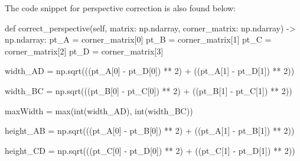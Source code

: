 \documentclass[
]{article}
\newenvironment{Shaded}{\begin{snugshade}}{\end{snugshade}}
\newcommand{\BuiltInTok}[1]{\textcolor[rgb]{0.00,0.23,0.31}{#1}}
\newcommand{\DecValTok}[1]{\textcolor[rgb]{0.68,0.00,0.00}{#1}}
\newcommand{\KeywordTok}[1]{\textcolor[rgb]{0.00,0.23,0.31}{#1}}
\newcommand{\NormalTok}[1]{\textcolor[rgb]{0.00,0.23,0.31}{#1}}
\newcommand{\OperatorTok}[1]{\textcolor[rgb]{0.37,0.37,0.37}{#1}}
\newcommand{\VariableTok}[1]{\textcolor[rgb]{0.07,0.07,0.07}{#1}}
\begin{document}
The code snippet for perspective correction is also found below:

\begin{Shaded}
\begin{Highlighting}[]
 \KeywordTok{def}\NormalTok{ correct\_perspective(}\VariableTok{self}\NormalTok{, matrix: np.ndarray, corner\_matrix: np.ndarray) }\OperatorTok{{-}\textgreater{}}\NormalTok{ np.ndarray:}
\NormalTok{  pt\_A }\OperatorTok{=}\NormalTok{ corner\_matrix[}\DecValTok{0}\NormalTok{]}
\NormalTok{  pt\_B }\OperatorTok{=}\NormalTok{ corner\_matrix[}\DecValTok{1}\NormalTok{]}
\NormalTok{  pt\_C }\OperatorTok{=}\NormalTok{ corner\_matrix[}\DecValTok{2}\NormalTok{]}
\NormalTok{  pt\_D }\OperatorTok{=}\NormalTok{ corner\_matrix[}\DecValTok{3}\NormalTok{]}

\NormalTok{  width\_AD }\OperatorTok{=}\NormalTok{ np.sqrt(((pt\_A[}\DecValTok{0}\NormalTok{] }\OperatorTok{{-}}\NormalTok{ pt\_D[}\DecValTok{0}\NormalTok{]) }\OperatorTok{**} \DecValTok{2}\NormalTok{) }\OperatorTok{+} 
\NormalTok{  ((pt\_A[}\DecValTok{1}\NormalTok{] }\OperatorTok{{-}}\NormalTok{ pt\_D[}\DecValTok{1}\NormalTok{]) }\OperatorTok{**} \DecValTok{2}\NormalTok{))}

\NormalTok{  width\_BC }\OperatorTok{=}\NormalTok{ np.sqrt(((pt\_B[}\DecValTok{0}\NormalTok{] }\OperatorTok{{-}}\NormalTok{ pt\_C[}\DecValTok{0}\NormalTok{]) }\OperatorTok{**} \DecValTok{2}\NormalTok{) }\OperatorTok{+} 
\NormalTok{  ((pt\_B[}\DecValTok{1}\NormalTok{] }\OperatorTok{{-}}\NormalTok{ pt\_C[}\DecValTok{1}\NormalTok{]) }\OperatorTok{**} \DecValTok{2}\NormalTok{))}

\NormalTok{  maxWidth }\OperatorTok{=} \BuiltInTok{max}\NormalTok{(}\BuiltInTok{int}\NormalTok{(width\_AD), }\BuiltInTok{int}\NormalTok{(width\_BC))}


\NormalTok{  height\_AB }\OperatorTok{=}\NormalTok{ np.sqrt(((pt\_A[}\DecValTok{0}\NormalTok{] }\OperatorTok{{-}}\NormalTok{ pt\_B[}\DecValTok{0}\NormalTok{]) }\OperatorTok{**} \DecValTok{2}\NormalTok{) }\OperatorTok{+} 
\NormalTok{  ((pt\_A[}\DecValTok{1}\NormalTok{] }\OperatorTok{{-}}\NormalTok{ pt\_B[}\DecValTok{1}\NormalTok{]) }\OperatorTok{**} \DecValTok{2}\NormalTok{))}

\NormalTok{  height\_CD }\OperatorTok{=}\NormalTok{ np.sqrt(((pt\_C[}\DecValTok{0}\NormalTok{] }\OperatorTok{{-}}\NormalTok{ pt\_D[}\DecValTok{0}\NormalTok{]) }\OperatorTok{**} \DecValTok{2}\NormalTok{) }\OperatorTok{+} 
\NormalTok{  ((pt\_C[}\DecValTok{1}\NormalTok{] }\OperatorTok{{-}}\NormalTok{ pt\_D[}\DecValTok{1}\NormalTok{]) }\OperatorTok{**} \DecValTok{2}\NormalTok{))}


\end{Highlighting}
\end{Shaded}
\end{document}
